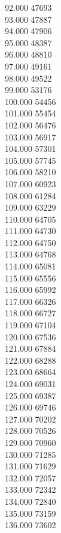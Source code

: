 { 92.000	47693 \\
 93.000	47887 \\
 94.000	47906 \\
 95.000	48387 \\
 96.000	48810 \\
 97.000	49161 \\
 98.000	49522 \\
 99.000	53176 \\
 100.000	54456 \\
 101.000	55454 \\
 102.000	56476 \\
 103.000	56917 \\
 104.000	57301 \\
 105.000	57745 \\
 106.000	58210 \\
 107.000	60923 \\
 108.000	61284 \\
 109.000	63229 \\
 110.000	64705 \\
 111.000	64730 \\
 112.000	64750 \\
 113.000	64768 \\
 114.000	65081 \\
 115.000	65556 \\
 116.000	65992 \\
 117.000	66326 \\
 118.000	66727 \\
 119.000	67104 \\
 120.000	67536 \\
 121.000	67884 \\
 122.000	68288 \\
 123.000	68664 \\
 124.000	69031 \\
 125.000	69387 \\
 126.000	69746 \\
 127.000	70202 \\
 128.000	70526 \\
 129.000	70960 \\
 130.000	71285 \\
 131.000	71629 \\
 132.000	72057 \\
 133.000	72342 \\
 134.000	72840 \\
 135.000	73159 \\
 136.000	73602 \\
}
